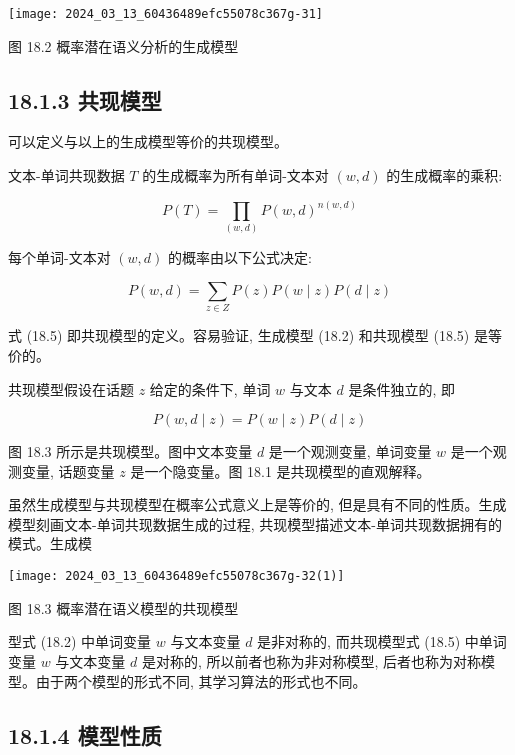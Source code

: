 \documentclass[10pt]{article}
\begin{document}
\begin{center}
\texttt{[image: 2024\_03\_13\_60436489efc55078c367g-31]}
\end{center}

图 18.2 概率潜在语义分析的生成模型

\subsection*{18.1.3 共现模型}
可以定义与以上的生成模型等价的共现模型。

文本-单词共现数据 $T$ 的生成概率为所有单词-文本对 $(w, d)$ 的生成概率的乘积:


\begin{equation*}
P(T)=\prod_{(w, d)} P(w, d)^{n(w, d)} \tag{18.4}
\end{equation*}


每个单词-文本对 $(w, d)$ 的概率由以下公式决定:


\begin{equation*}
P(w, d)=\sum_{z \in Z} P(z) P(w \mid z) P(d \mid z) \tag{18.5}
\end{equation*}


式 (18.5) 即共现模型的定义。容易验证, 生成模型 (18.2) 和共现模型 (18.5) 是等价的。

共现模型假设在话题 $z$ 给定的条件下, 单词 $w$ 与文本 $d$ 是条件独立的, 即


\begin{equation*}
P(w, d \mid z)=P(w \mid z) P(d \mid z) \tag{18.6}
\end{equation*}


图 18.3 所示是共现模型。图中文本变量 $d$ 是一个观测变量, 单词变量 $w$ 是一个观测变量, 话题变量 $z$ 是一个隐变量。图 18.1 是共现模型的直观解释。

虽然生成模型与共现模型在概率公式意义上是等价的, 但是具有不同的性质。生成模型刻画文本-单词共现数据生成的过程, 共现模型描述文本-单词共现数据拥有的模式。生成模

\begin{center}
\texttt{[image: 2024\_03\_13\_60436489efc55078c367g-32(1)]}
\end{center}

图 18.3 概率潜在语义模型的共现模型

型式 (18.2) 中单词变量 $w$ 与文本变量 $d$ 是非对称的, 而共现模型式 (18.5) 中单词变量 $w$ 与文本变量 $d$ 是对称的, 所以前者也称为非对称模型, 后者也称为对称模型。由于两个模型的形式不同, 其学习算法的形式也不同。

\subsection*{18.1.4 模型性质}
\end{document}
